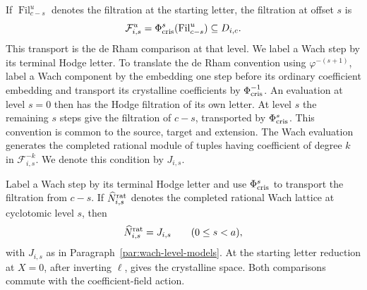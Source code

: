If \(\operatorname{Fil}^u_{c-s}\) denotes the filtration at the starting letter, the filtration at offset \(s\) is
\[
 \mathcal F_{i,s}^u=\Phi_{\rm cris}^s(\operatorname{Fil}^u_{c-s})\subseteq D_{i,c}.
\]
This transport is the de Rham comparison at that level. We label a Wach
step by its terminal Hodge letter. To translate
the de Rham convention using \(\varphi^{-(s+1)}\), label a
Wach component by the embedding one step before its
ordinary coefficient embedding and transport its crystalline
coefficients by \(\Phi_{\rm cris}^{-1}\). An evaluation at
level \(s=0\) then has the Hodge filtration of its own letter.
At level \(s\) the remaining \(s\) steps give the filtration of
\(c-s\), transported by \(\Phi_{\rm cris}^s\).
This convention is common to the source, target and extension.
The Wach evaluation generates the completed rational module
of tuples having coefficient of degree \(k\) in
\(\mathcal F_{i,s}^{-k}\). We denote this condition by
\(J_{i,s}\).

\begin{lemma}\label{lem:wach-evaluated-hodge}
Label a Wach step by its terminal Hodge letter and use
\(\Phi_{\rm cris}^{s}\) to transport the filtration from \(c-s\).
If \(\widehat N_{i,s}^{\rm rat}\) denotes the completed rational Wach lattice at cyclotomic level \(s\), then
\[
 \widehat N_{i,s}^{\rm rat}=J_{i,s}\qquad(0\le s<a),
\]
with \(J_{i,s}\) as in Paragraph~\ref{par:wach-level-models}. At the starting letter
reduction at \(X=0\), after inverting \(\ell\), gives the crystalline
space. Both comparisons commute with the coefficient-field action.
\end{lemma}


